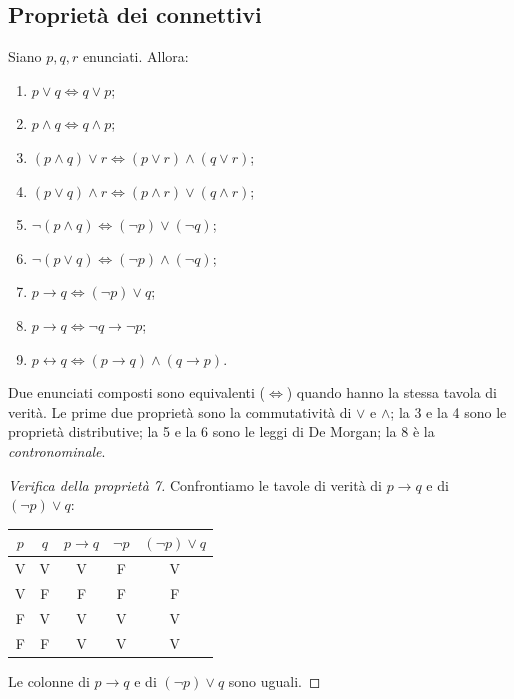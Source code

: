 \documentclass[11pt,a4paper]{article}
\newcommand{\V}{\textsf{V}}
\newcommand{\F}{\textsf{F}}
\begin{document}
\subsection{Proprietà dei connettivi}

\begin{proposizione}
Siano $p, q, r$ enunciati. Allora:
\begin{enumerate}
    \item $p \lor q \iff q \lor p$;
    \item $p \land q \iff q \land p$;
    \item $(p \land q) \lor r \iff (p \lor r) \land (q \lor r)$;
    \item $(p \lor q) \land r \iff (p \land r) \lor (q \land r)$;
    \item $\neg(p \land q) \iff (\neg p) \lor (\neg q)$;
    \item $\neg(p \lor q) \iff (\neg p) \land (\neg q)$;
    \item $p \to q \iff (\neg p) \lor q$;
    \item $p \to q \iff \neg q \to \neg p$;
    \item $p \leftrightarrow q \iff (p \to q) \land (q \to p)$.
\end{enumerate}
\end{proposizione}

Due enunciati composti sono equivalenti ($\iff$) quando hanno la stessa
tavola di verità. Le prime due proprietà sono la commutatività di $\lor$ e
$\land$; la 3 e la 4 sono le proprietà distributive; la 5 e la 6 sono le
leggi di De Morgan; la 8 è la \emph{contronominale}.

\begin{proof}[Verifica della proprietà 7]
Confrontiamo le tavole di verità di $p \to q$ e di $(\neg p) \lor q$:
\begin{center}
\begin{tabular}{cc|c|c|c}
$p$ & $q$ & $p \to q$ & $\neg p$ & $(\neg p) \lor q$ \\ \hline
\V & \V & \V & \F & \V \\
\V & \F & \F & \F & \F \\
\F & \V & \V & \V & \V \\
\F & \F & \V & \V & \V
\end{tabular}
\end{center}
Le colonne di $p \to q$ e di $(\neg p) \lor q$ sono uguali.
\end{proof}
\end{document}
